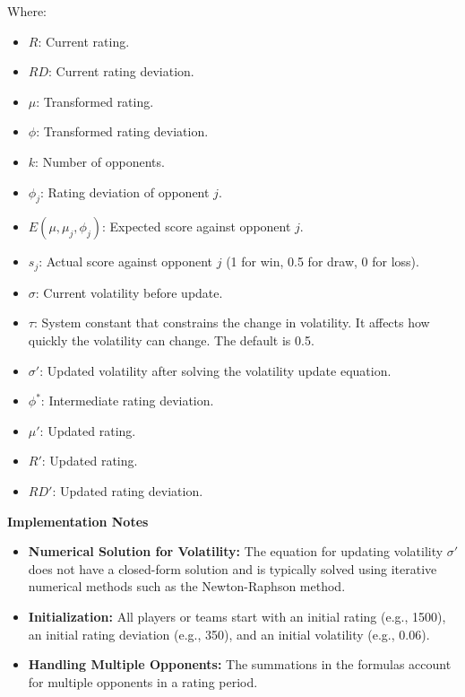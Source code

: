 \begin{itemize}
Where:
    \begin{itemize}
        \item \( R \): Current rating.
        \item \( RD \): Current rating deviation.
        \item \( \mu \): Transformed rating.
        \item \( \phi \): Transformed rating deviation.
        \item \( k \): Number of opponents.
        \item \( \phi_j \): Rating deviation of opponent \( j \).
        \item \( E(\mu, \mu_j, \phi_j) \): Expected score against opponent \( j \).
        \item \( s_j \): Actual score against opponent \( j \) (1 for win, 0.5 for draw, 0 for loss).
        \item \( \sigma \): Current volatility before update.
        \item \( \tau \): System constant that constrains the change in volatility. It affects how quickly the volatility can change. The default is 0.5.
        \item \( \sigma' \): Updated volatility after solving the volatility update equation.
        \item \( \phi^* \): Intermediate rating deviation.
        \item \( \mu' \): Updated rating.
        \item \( R' \): Updated rating.
        \item \( RD' \): Updated rating deviation.
    \end{itemize}
    
\textbf{Implementation Notes}
    \begin{itemize}
        \item \textbf{Numerical Solution for Volatility:} The equation for updating volatility \( \sigma' \) does not have a closed-form solution and is typically solved using iterative numerical methods such as the Newton-Raphson method.
        \item \textbf{Initialization:} All players or teams start with an initial rating (e.g., 1500), an initial rating deviation (e.g., 350), and an initial volatility (e.g., 0.06).
        \item \textbf{Handling Multiple Opponents:} The summations in the formulas account for multiple opponents in a rating period.
    \end{itemize}



\end{itemize}
